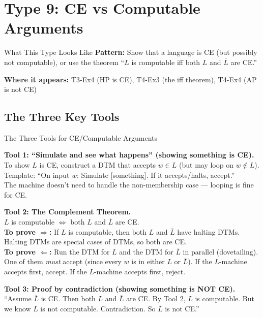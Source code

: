 \documentclass[11pt,a4paper]{article}
\begin{document}
\newpage
\section{Type 9: CE vs Computable Arguments}

\begin{notebox}{What This Type Looks Like}
\textbf{Pattern:} Show that a language is CE (but possibly not computable), or use the theorem ``$L$ is computable iff both $L$ and $\overline{L}$ are CE.''

\textbf{Where it appears:} T3-Ex4 (HP is CE), T4-Ex3 (the iff theorem), T4-Ex4 ($\overline{\text{AP}}$ is not CE)
\end{notebox}

\subsection{The Three Key Tools}

\begin{conceptbox}{The Three Tools for CE/Computable Arguments}

\textbf{Tool 1: ``Simulate and see what happens'' (showing something is CE).}\\
To show $L$ is CE, construct a DTM that accepts $w \in L$ (but may loop on $w \notin L$).\\
Template: ``On input $w$: Simulate [something]. If it accepts/halts, accept.''\\
The machine doesn't need to handle the non-membership case --- looping is fine for CE.

\textbf{Tool 2: The Complement Theorem.}\\
$L$ is computable $\iff$ both $L$ and $\overline{L}$ are CE.\\
\textbf{To prove $\Rightarrow$:} If $L$ is computable, then both $L$ and $\overline{L}$ have halting DTMs. Halting DTMs are special cases of DTMs, so both are CE.\\
\textbf{To prove $\Leftarrow$:} Run the DTM for $L$ and the DTM for $\overline{L}$ in parallel (dovetailing). One of them \emph{must} accept (since every $w$ is in either $L$ or $\overline{L}$). If the $L$-machine accepts first, accept. If the $\overline{L}$-machine accepts first, reject.

\textbf{Tool 3: Proof by contradiction (showing something is NOT CE).}\\
``Assume $\overline{L}$ is CE. Then both $L$ and $\overline{L}$ are CE. By Tool 2, $L$ is computable. But we know $L$ is not computable. Contradiction. So $\overline{L}$ is not CE.''
\end{conceptbox}
\end{document}
